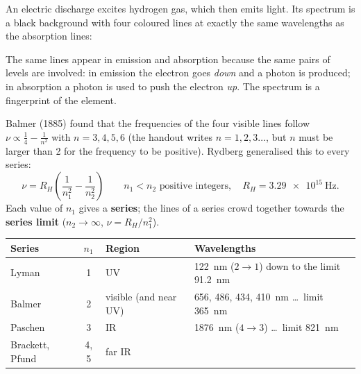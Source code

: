 An electric discharge excites hydrogen gas, which then emits light. Its spectrum is a black background
with four coloured lines at exactly the same wavelengths as the absorption lines:
\begin{center}
\end{center}
The same lines appear in emission and absorption because the same pairs of levels are involved: in
emission the electron goes \emph{down} and a photon is produced; in absorption a photon is used to
push the electron \emph{up}. The spectrum is a fingerprint of the element.

Balmer (1885) found that the frequencies of the four visible lines follow
$\nu \propto \frac14 - \frac1{n^2}$ with $n = 3, 4, 5, 6$ (the handout writes $n = 1, 2, 3\dots$, but
$n$ must be larger than 2 for the frequency to be positive). Rydberg generalised this to every series:
\[\boxed{\nu = R_H\left(\frac1{n_1^2} - \frac1{n_2^2}\right)}\qquad n_1 < n_2 \text{ positive integers},
\quad R_H = \SI{3.29e15}{\hertz}.\]
Each value of $n_1$ gives a \textbf{series}; the lines of a series crowd together towards the
\textbf{series limit} ($n_2\to\infty$, $\nu = R_H/n_1^2$).
\begin{center}\small
\begin{tabular}{@{}l c l l@{}}
\toprule
Series & $n_1$ & Region & Wavelengths\\ \midrule
Lyman & 1 & UV & 122~nm ($2\to1$) down to the limit 91.2~nm\\
Balmer & 2 & visible (and near UV) & 656, 486, 434, 410~nm \dots\ limit 365~nm\\
Paschen & 3 & IR & 1876~nm ($4\to3$) \dots\ limit 821~nm\\
Brackett, Pfund & 4, 5 & far IR & \\ \bottomrule
\end{tabular}
\end{center}

